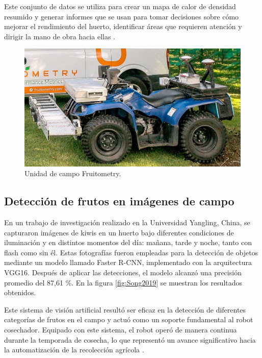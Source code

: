 Este conjunto de datos se utiliza para crear un mapa de calor de densidad resumido y generar informes que se usan para tomar decisiones sobre cómo mejorar el rendimiento del huerto, identificar áreas que requieren atención y dirigir la mano de obra hacia ellas \citep{WEBSITE:Fruitometry2024}.

\vspace{1cm}
\begin{figure}[htbp]
	\centering
	\includegraphics[width=.5\textwidth]{./Figures/Fruitometry.png}
	\caption{Unidad de campo Fruitometry\protect\footnotemark.}
	\label{fig:Fruitometry}
\end{figure}
\vspace{1cm}


\subsection{Detección de frutos en imágenes de campo}

En un trabajo de investigación realizado en la Universidad Yangling, China, se capturaron imágenes de kiwis en un huerto bajo diferentes condiciones de iluminación y en distintos momentos del día: mañana, tarde y noche, tanto con flash como sin él. Estas fotografías fueron empleadas para la detección de objetos mediante un modelo llamado Faster R-CNN, implementado con la arquitectura VGG16. Después de aplicar las detecciones, el modelo alcanzó una precisión promedio del 87,61 \%. En la figura \ref{fig:Song2019} se muestran los resultados obtenidos.

Este sistema de visión artificial resultó ser eficaz en la detección de diferentes categorías de frutos en el campo y actuó como un soporte fundamental al robot cosechador. Equipado con este sistema, el robot operó de manera continua durante la temporada de cosecha, lo que representó un avance significativo hacia la automatización de la recolección agrícola \citep{Song2019}.

\vspace{1cm}

